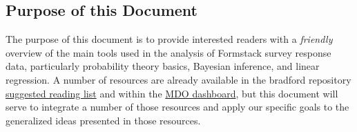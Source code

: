 \subsection*{Purpose of this Document}
The purpose of this document is to provide interested readers with a \textit{friendly} overview of the main tools used in the analysis of Formstack survey response data, particularly probability theory basics, Bayesian inference, and linear regression. A number of resources are already available in the bradford repository \href{https://github.com/massgov/bradford/blob/master/docs/suggested_reading.txt}{suggested reading list} and within the \href{http://mdo.digital.mass.gov/bayes.html}{MDO dashboard}, but this document will serve to integrate a number of those resources and apply our specific goals to the generalized ideas presented in those resources.